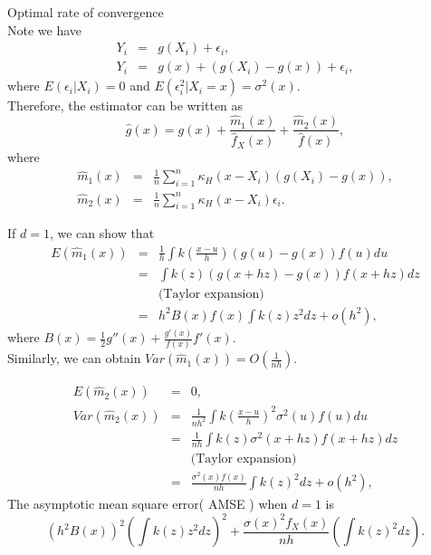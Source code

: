 \documentclass[a4paper,11pt]{article}
\begin{document}
Optimal rate of convergence\\
Note we have
\begin{eqnarray*}
Y_i &=& g(X_i) + \epsilon_i, \\
Y_i &=& g(x) + (g(X_i) - g(x)) + \epsilon_i,
\end{eqnarray*}
where $E(\epsilon_i | X_i) = 0$ and $E(\epsilon^2_i | X_i = x) = \sigma^2(x)$. \\
Therefore, the estimator can be written as
\begin{equation*}
\hat{g}(x) = g(x) + \frac{\hat{m}_{1}(x)}{\hat{f}_{X}(x)} + \frac{\hat{m}_{2}(x)}{\hat{f}(x)},
\end{equation*}
where
\begin{eqnarray*}
\hat{m}_{1}(x) &=&  \frac{1}{n} \sum_{i = 1}^{n} \kappa_{H}(x - X_i)  (g(X_i) - g(x)), \\
\hat{m}_{2}(x) &=&  \frac{1}{n} \sum_{i = 1}^{n} \kappa_{H}(x - X_i)  \epsilon_i.
\end{eqnarray*}

If $d=1$, we can show that
\begin{eqnarray*}
E(\hat{m}_{1}(x)) &=& \frac{1}{h} \int k \left( \frac{x-u}{h} \right) (g(u) - g(x)) f(u) du\\
&=& \int k(z) (g(x+hz) - g(x)) f(x+hz) dz\\
&& \text{(Taylor expansion)} \\ 
&=& h^2 B(x) f(x) \int k(z) z^2 dz + o(h^2),
\end{eqnarray*}
where $B(x) = \frac{1}{2} g''(x) + \frac{g'(x)}{f(x)} f'(x)$.\\
Similarly, we can obtain $Var( \hat{m}_{1}(x)) = O(\frac{1}{nh})$.

\begin{eqnarray*}
E(\hat{m}_{2}(x)) &=& 0, \\
Var(\hat{m}_{2}(x)) &=& \frac{1}{nh^2} \int k \left( \frac{x-u}{h} \right)^2  \sigma^2(u) f(u) du \\
&=& \frac{1}{nh} \int  k(z) \sigma^2(x+hz) f(x+hz) dz \\
&& \text{(Taylor expansion)} \\
&=& \frac{\sigma^2(x)f(x)}{nh}  \int k(z)^2 dz + o(h^2),
\end{eqnarray*}
The asymptotic mean square error( AMSE ) when $d= 1$ is
\begin{equation*}
\left( h^{2} B(x) \right)^{2} \left( \int k(z) z^{2} dz \right)^{2} +  \frac{ \sigma(x)^{2} f_{X}(x)}{nh}  \left( \int k(z)^2 dz \right).
\end{equation*}
\end{document}
